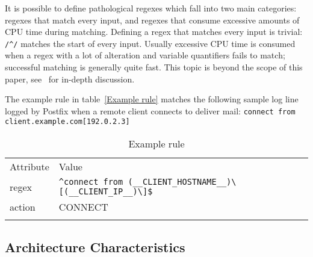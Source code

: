 \documentclass{svmult}
\newcommand{\tabletopline}[0]{%
    \hline%
    \noalign{\smallskip}%
}
\newcommand{\tablebottomline}[0]{%
    \noalign{\smallskip}%
    \hline%
}
\newcommand{\tablemiddleline}[0]{%
    \noalign{\smallskip}%
    \hline%
    \noalign{\smallskip}%
}
\newcommand{\refwithlabel}[2]{%
    #1~\vref{#2}%
}
\newcommand{\tableref}[1]{%
    \refwithlabel{table}{#1}%
}
\newcommand{\daemon}[1]{%
    \texttt{postfix/#1}%
}
\newcommand{\tab}[0]{%
    \hspace*{2em}%
}
\begin{document}
It is possible to define pathological regexes which fall into two main
categories: regexes that match every input, and regexes that consume
excessive amounts of CPU time during matching.  Defining a regex that
matches every input is trivial: \verb!/^/! matches the start of every
input.  Usually excessive CPU time is consumed when a regex with a lot of
alteration and variable quantifiers fails to match; successful matching is
generally quite fast.  This topic is beyond the scope of this paper,
see~\cite{mastering-regular-expressions} for in-depth discussion.

The example rule in \tableref{Example rule} matches the following sample
log line logged by Postfix when a remote client connects to deliver mail:
\newline{}\tab{}\verb!connect from client.example.com[192.0.2.3]!

\begin{table}[htbp]
    \caption{Example rule}
    \empty{}\label{Example rule}
    \begin{tabular}[]{ll}
        \tabletopline{}%
        Attribute                 & Value                                            \\
        \tablemiddleline{}%
        regex                     & \verb!^connect from (__CLIENT_HOSTNAME__)\[(__CLIENT_IP__)\]$! \\
        action                    & CONNECT                                          \\
        \tablebottomline{}%
    \end{tabular}
\end{table}

\subsection{Architecture Characteristics}

\label{Architecture characteristics}
\end{document}
